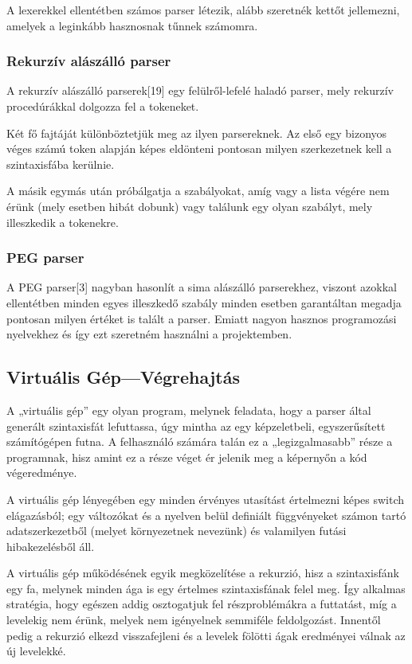 A lexerekkel ellentétben számos parser létezik, alább szeretnék kettőt jellemezni, amelyek a leginkább hasznosnak tűnnek számomra.

\subsubsection{Rekurzív alászálló parser}

A rekurzív alászálló parserek[19] egy felülről-lefelé haladó parser, mely rekurzív procedúrákkal dolgozza fel a tokeneket.

Két fő fajtáját különböztetjük meg az ilyen parsereknek. Az első egy bizonyos véges számú token alapján képes eldönteni pontosan milyen szerkezetnek kell a szintaxisfába kerülnie.

A másik egymás után próbálgatja a szabályokat, amíg vagy a lista végére nem érünk (mely esetben hibát dobunk) vagy találunk egy olyan szabályt, mely illeszkedik a tokenekre.

\subsubsection{PEG parser}

A PEG parser[3] nagyban hasonlít a sima alászálló parserekhez, viszont azokkal ellentétben minden egyes illeszkedő szabály minden esetben garantáltan megadja pontosan milyen értéket is talált a parser. Emiatt nagyon hasznos programozási nyelvekhez és így ezt szeretném használni a projektemben.

\subsection{Virtuális Gép—Végrehajtás}

A „virtuális gép” egy olyan program, melynek feladata, hogy a parser által generált szintaxisfát lefuttassa, úgy mintha az egy képzeletbeli, egyszerűsített számítógépen futna. A felhasználó számára talán ez a „legizgalmasabb” része a programnak, hisz amint ez a része véget ér jelenik meg a képernyőn a kód végeredménye.

A virtuális gép lényegében egy minden érvényes utasítást értelmezni képes switch elágazásból; egy változókat és a nyelven belül definiált függvényeket számon tartó adatszerkezetből (melyet környezetnek nevezünk) és valamilyen futási hibakezelésből áll.

A virtuális gép működésének egyik megközelítése a rekurzió, hisz a szintaxisfánk egy fa, melynek minden ága is egy értelmes szintaxisfának felel meg. Így alkalmas stratégia, hogy egészen addig osztogatjuk fel részproblémákra a futtatást, míg a levelekig nem érünk, melyek nem igényelnek semmiféle feldolgozást. Innentől pedig a rekurzió elkezd visszafejleni és a levelek fölötti ágak eredményei válnak az új levelekké.

